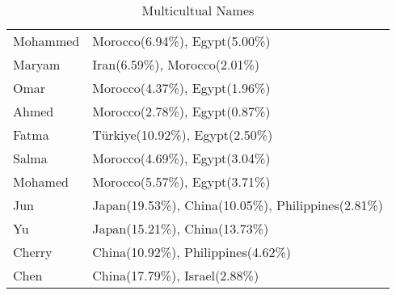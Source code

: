 \begin{table*}[htbp]
\begin{tabular}{@{}lp{11cm}@{}}
Mohammed & Morocco(6.94\%), Egypt(5.00\%) \\
Maryam   & Iran(6.59\%), Morocco(2.01\%) \\
Omar     & Morocco(4.37\%), Egypt(1.96\%) \\
Ahmed    & Morocco(2.78\%), Egypt(0.87\%) \\
Fatma    & Türkiye(10.92\%), Egypt(2.50\%) \\
Salma    & Morocco(4.69\%), Egypt(3.04\%) \\
Mohamed  & Morocco(5.57\%), Egypt(3.71\%) \\
\midrule
Jun      & Japan(19.53\%), China(10.05\%), Philippines(2.81\%) \\
Yu       & Japan(15.21\%), China(13.73\%) \\
Cherry   & China(10.92\%), Philippines(4.62\%) \\
Chen     & China(17.79\%), Israel(2.88\%) \\
\bottomrule
\end{tabular}
\caption{Multicultual Names}
\label{tab:name_country_bias}
\end{table*}


